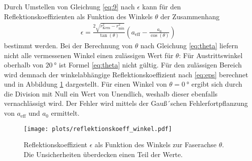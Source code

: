 Durch Umstellen von Gleichung \eqref{eq:9} nach $\epsilon$ kann für den Reflektionskoeffizienten als Funktion des Winkels $\theta$ der Zusammenhang 
\begin{align}
    \epsilon = \frac{2\sqrt{r_\mathrm{Kern}^2 -r_\mathrm{min}^2 }}{\tan(\theta)} \left(a_\mathrm{eff}-\frac{a_0}{\cos(\theta)}\right)
    \label{eq:eps}
\end{align}
bestimmt werden. Bei der Berechnung von $\theta$ nach Gleichung \eqref{eq:theta} liefern nicht alle vermessenen Winkel einen zulässigen Wert für $\theta$: Für Austrittswinkel oberhalb von $\SI{20}{°}$ ist Formel \eqref{eq:theta} nicht gültig. 
Für den zulässigen Bereich wird demnach der winkelabhängige Reflektionskoeffizient nach \eqref{eq:eps} berechnet und in Abbildung \ref{fig:reflektionskoeff_winkel} dargestellt. Für einen Winkel von $\theta = \SI{0}{°}$ ergibt sich durch die Division mit Null ein Wert von Unendlich, weshalb dieser ebenfalls vernachlässigt wird. Der Fehler wird mittels der Gauß´schen Fehlerfortpflanzung von $a_\mathrm{eff}$ und $a_\mathrm{0}$ ermittelt.
\begin{figure}
    \centering
    \texttt{[image: plots/reflektionskoeff\_winkel.pdf]}
    \caption{Reflektionskoeffizient $\epsilon$ als Funktion des Winkels zur Faserachse $\theta$. Die Unsicherheiten überdecken einen Teil der Werte.}
    \label{fig:reflektionskoeff_winkel}
\end{figure}
\FloatBarrier
